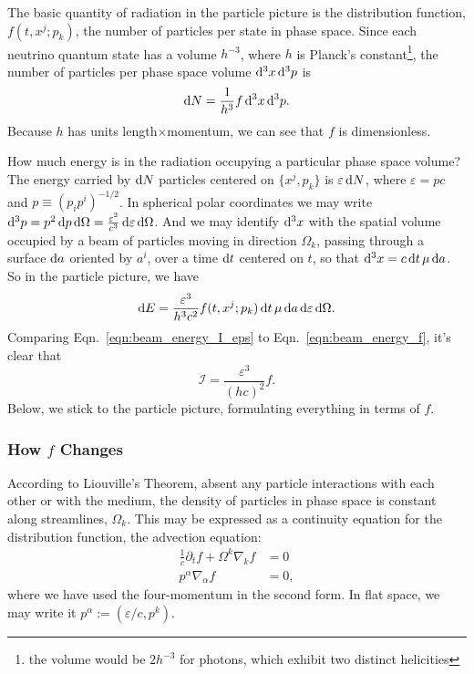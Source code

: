 The basic quantity of radiation in the particle picture is the distribution
function, $f(t,x^j;p_k)$, the number of particles per state in phase space.
Since each neutrino quantum state has a volume $h^{-3}$, where $h$ is Planck's
constant\footnote{the volume would be $2h^{-3}$ for photons, which exhibit two
distinct helicities},
the number of particles per phase space volume $\mathrm{d}^3x\,\mathrm{d}^3p$ is
\begin{equation}
  \label{eqn:dN_flatspace}
  \mathrm{d} N = \frac{1}{h^3} f \,\mathrm{d}^3 x\, \mathrm{d}^3p.
\end{equation}
Because $h$ has units length$\times$momentum, we can see that $f$ is
dimensionless.

How much energy is in the radiation occupying a particular phase space volume?
The energy carried by $\mathrm{d} N$ particles centered on $\{x^j,p_k\}$
is $\varepsilon\,\mathrm{d} N$,
where $\varepsilon=pc$ and $p\equiv (p_ip^i)^{-1/2}$.
In spherical polar coordinates we may write
$\mathrm{d}^3p=p^2\,\mathrm{d} p\,\mathrm{d}\Omega=\frac{\varepsilon^2}{c^3}\,\mathrm{d}\varepsilon\,\mathrm{d}\Omega$.
And we may identify $\mathrm{d}^3x$
with the spatial volume occupied by a beam of particles
moving in direction $\Omega_k$,
passing through a surface $\mathrm{d} a$
oriented by $a^i$,
over a time $\mathrm{d} t$ centered on $t$,
so that $\mathrm{d}^3x=c\,\mathrm{d} t\,\mu\,\mathrm{d} a$.
So in the particle picture, we have
\begin{equation}
  \label{eqn:beam_energy_f}
  \mathrm{d} E = \frac{\varepsilon^3}{h^3c^2} f(t,x^j;p_k)\,
  \mathrm{d} t\,\mu\,\mathrm{d} a\, \mathrm{d}\varepsilon\,\mathrm{d}\Omega.
\end{equation}
Comparing Eqn.~\ref{eqn:beam_energy_I_eps} to Eqn.~\ref{eqn:beam_energy_f},
it's clear that
\begin{equation}
  \mathcal{I}=\frac{\varepsilon^3}{(hc)^2}f. \nonumber
\end{equation}
Below, we stick to the particle picture, formulating everything in terms of $f$.

\subsubsection{How $f$ Changes}
According to Liouville's Theorem,
absent any particle interactions with each other or with the medium, the density
of particles in phase space is constant along streamlines, $\Omega_k$. This may be
expressed as a continuity equation for the distribution function,
the advection equation:
\begin{align}
  \frac{1}{c}\partial_t f + \Omega^k\nabla_k f &= 0 \\
  \label{eqn:f_advection}
  p^\alpha\nabla_\alpha f &= 0,
\end{align}
where we have used the four-momentum in the second form.
In flat space, we may write it $p^\alpha:=(\varepsilon/c,p^k)$.

